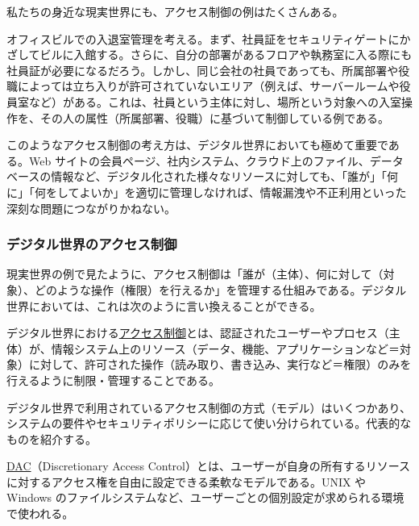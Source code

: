 \documentclass[uplatex]{jsarticle}
\def\label#1{}%
\begin{document}
私たちの身近な現実世界にも、アクセス制御の例はたくさんある。

\begin{exa}[社員証による入退室管理]\label{exa:ch2b-office-badge}
オフィスビルでの入退室管理を考える。まず、社員証をセキュリティゲートにかざしてビルに入館する。さらに、自分の部署があるフロアや執務室に入る際にも社員証が必要になるだろう。しかし、同じ会社の社員であっても、所属部署や役職によっては立ち入りが許可されていないエリア（例えば、サーバールームや役員室など）がある。これは、社員という主体に対し、場所という対象への入室操作を、その人の属性（所属部署、役職）に基づいて制御している例である。
\end{exa}

このようなアクセス制御の考え方は、デジタル世界においても極めて重要である。Web サイトの会員ページ、社内システム、クラウド上のファイル、データベースの情報など、デジタル化された様々なリソースに対しても、「誰が」「何に」「何をしてよいか」を適切に管理しなければ、情報漏洩や不正利用といった深刻な問題につながりかねない。

\subsubsection{デジタル世界のアクセス制御}

現実世界の例で見たように、アクセス制御は「誰が（主体）、何に対して（対象）、どのような操作（権限）を行えるか」を管理する仕組みである。デジタル世界においては、これは次のように言い換えることができる。

\begin{dfn}[デジタル世界のアクセス制御]\label{dfn:ch2b-digital-access-control}
デジタル世界における\underline{アクセス制御}とは、認証されたユーザーやプロセス（主体）が、情報システム上のリソース（データ、機能、アプリケーションなど＝対象）に対して、許可された操作（読み取り、書き込み、実行など＝権限）のみを行えるように制限・管理することである。
\end{dfn}

デジタル世界で利用されているアクセス制御の方式（モデル）はいくつかあり、システムの要件やセキュリティポリシーに応じて使い分けられている。代表的なものを紹介する。

\begin{dfn}[DAC]\label{dfn:dac}
\underline{DAC}（Discretionary Access Control）とは、ユーザーが自身の所有するリソースに対するアクセス権を自由に設定できる柔軟なモデルである。UNIX や Windows のファイルシステムなど、ユーザーごとの個別設定が求められる環境で使われる。
\end{dfn}
\end{document}
